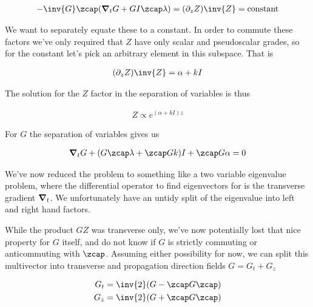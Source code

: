 \begin{align}\label{eqn:fooc3}
-\inv{G} \zcap (\spacegrad_t G + G I \zcap \lambda) = (\partial_z Z)\inv{Z} = \text{constant}
\end{align}

We want to separately equate these to a constant.  In order to commute these factors we've only required that $Z$ have only scalar and pseudoscalar grades, so for the constant let's pick an arbitrary element in this subspace.  That is

\begin{align}\label{eqn:fooc4}
(\partial_z Z)\inv{Z} = \alpha + k I
\end{align}

The solution for the $Z$ factor in the separation of variables is thus

\begin{align}\label{eqn:fooc5}
Z \propto e^{(\alpha + k I)z}
\end{align}

For $G$ the separation of variables gives us

\begin{align}\label{eqn:fooc6}
\spacegrad_t G + (G \zcap \lambda + \zcap G k) I + \zcap G \alpha = 0
\end{align}

We've now reduced the problem to something like a two variable eigenvalue problem, where the differential operator to find eigenvectors for is the transverse gradient $\boldsymbol{\nabla}_t$.  We unfortunately have an untidy split of the eigenvalue into left and right hand factors.
%

While the product $GZ$ was transverse only, we've now potentially lost that nice property for $G$ itself, and do not know if $G$ is strictly commuting or anticommuting with $\zcap$.  Assuming either possibility for now, we can split this multivector into transverse and propagation direction fields $G = G_t + G_z$

\begin{align}\label{eqn:fooc7}
G_t &= \inv{2}(G - \zcap G \zcap) \\
G_z &= \inv{2}(G + \zcap G \zcap)
\end{align}

